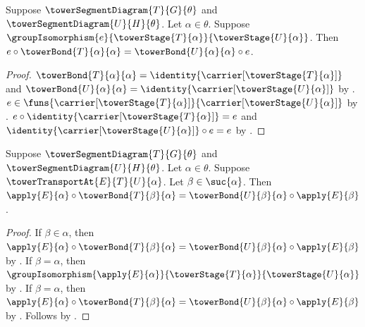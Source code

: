 \begin{proposition}\label{tower_transport_self_square}
    Suppose $\towerSegmentDiagram{T}{G}{\theta}$ and
        $\towerSegmentDiagram{U}{H}{\theta}$.
    Let $\alpha\in\theta$.
    Suppose $\groupIsomorphism{e}
        {\towerStage{T}{\alpha}}{\towerStage{U}{\alpha}}$.
    Then $e\circ\towerBond{T}{\alpha}{\alpha}=
        \towerBond{U}{\alpha}{\alpha}\circ e$.
\end{proposition}
\begin{proof}
    $\towerBond{T}{\alpha}{\alpha}=
        \identity{\carrier[\towerStage{T}{\alpha}]}$ and
    $\towerBond{U}{\alpha}{\alpha}=
        \identity{\carrier[\towerStage{U}{\alpha}]}$ by
        .
    $e\in\funs{\carrier[\towerStage{T}{\alpha}]}
        {\carrier[\towerStage{U}{\alpha}]}$ by
        .
    $e\circ\identity{\carrier[\towerStage{T}{\alpha}]}=e$ and
        $\identity{\carrier[\towerStage{U}{\alpha}]}\circ e=e$ by
        .
\end{proof}

\begin{proposition}\label{tower_transport_at_nonstrict_square}
    Suppose $\towerSegmentDiagram{T}{G}{\theta}$ and
        $\towerSegmentDiagram{U}{H}{\theta}$.
    Let $\alpha\in\theta$.
    Suppose $\towerTransportAt{E}{T}{U}{\alpha}$.
    Let $\beta\in\suc{\alpha}$.
    Then $\apply{E}{\alpha}\circ\towerBond{T}{\beta}{\alpha}=
        \towerBond{U}{\beta}{\alpha}\circ\apply{E}{\beta}$.
\end{proposition}
\begin{proof}
    If $\beta\in\alpha$, then
        $\apply{E}{\alpha}\circ\towerBond{T}{\beta}{\alpha}=
            \towerBond{U}{\beta}{\alpha}\circ\apply{E}{\beta}$ by
        .
    If $\beta=\alpha$, then
        $\groupIsomorphism{\apply{E}{\alpha}}
            {\towerStage{T}{\alpha}}{\towerStage{U}{\alpha}}$ by
        .
    If $\beta=\alpha$, then
        $\apply{E}{\alpha}\circ\towerBond{T}{\beta}{\alpha}=
            \towerBond{U}{\beta}{\alpha}\circ\apply{E}{\beta}$ by
        .
    Follows by .
\end{proof}

